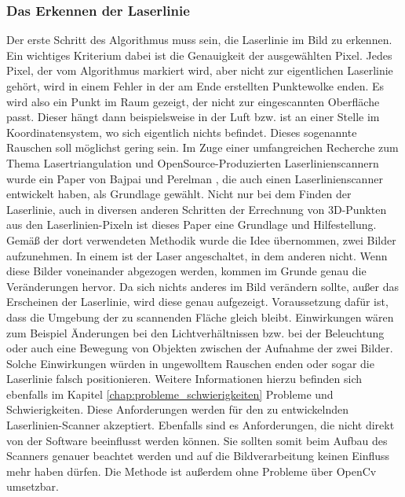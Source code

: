 	\label{chap:bildverarbeitung}
	\subsubsection{Das Erkennen der Laserlinie}
	Der erste Schritt des Algorithmus muss sein, die Laserlinie im Bild zu erkennen. Ein wichtiges Kriterium dabei ist die Genauigkeit der ausgewählten Pixel. Jedes Pixel, der vom Algorithmus markiert wird, aber nicht zur eigentlichen Laserlinie gehört, wird in einem Fehler in der am Ende erstellten Punktewolke enden. Es wird also ein Punkt im Raum gezeigt, der nicht zur eingescannten Oberfläche passt. Dieser hängt dann beispielsweise in der Luft bzw. ist an einer Stelle im Koordinatensystem, wo sich eigentlich nichts befindet. Dieses sogenannte Rauschen soll möglichst gering sein. \newline
	Im Zuge einer umfangreichen Recherche zum Thema Lasertriangulation und OpenSource-Produzierten Laserlinienscannern wurde ein Paper von Bajpai und Perelman \citep[vgl.][]{baj-per}, die auch einen Laserlinienscanner entwickelt haben, als Grundlage gewählt. Nicht nur bei dem Finden der Laserlinie, auch in diversen anderen Schritten der Errechnung von 3D-Punkten aus den Laserlinien-Pixeln ist dieses Paper eine Grundlage und Hilfestellung. Gemäß der dort verwendeten Methodik wurde die Idee übernommen, zwei Bilder aufzunehmen. In einem ist der Laser angeschaltet, in dem anderen nicht. Wenn diese Bilder voneinander abgezogen werden, kommen im Grunde genau die Veränderungen hervor. Da sich nichts anderes im Bild verändern sollte, außer das Erscheinen der Laserlinie, wird diese genau aufgezeigt.
	Voraussetzung dafür ist, dass die Umgebung der zu scannenden Fläche gleich bleibt. Einwirkungen wären zum Beispiel Änderungen bei den Lichtverhältnissen bzw. bei der Beleuchtung oder auch eine Bewegung von Objekten zwischen der Aufnahme der zwei Bilder. Solche Einwirkungen würden in ungewolltem Rauschen enden oder sogar die Laserlinie falsch positionieren. Weitere Informationen hierzu befinden sich ebenfalls im Kapitel \ref{chap:probleme_schwierigkeiten} Probleme und Schwierigkeiten. Diese Anforderungen werden für den zu entwickelnden Laserlinien-Scanner akzeptiert. Ebenfalls sind es Anforderungen, die nicht direkt von der Software beeinflusst werden können. Sie sollten somit beim Aufbau des Scanners genauer beachtet werden und auf die Bildverarbeitung keinen Einfluss mehr haben dürfen. Die Methode ist außerdem ohne Probleme über OpenCv umsetzbar.
	
